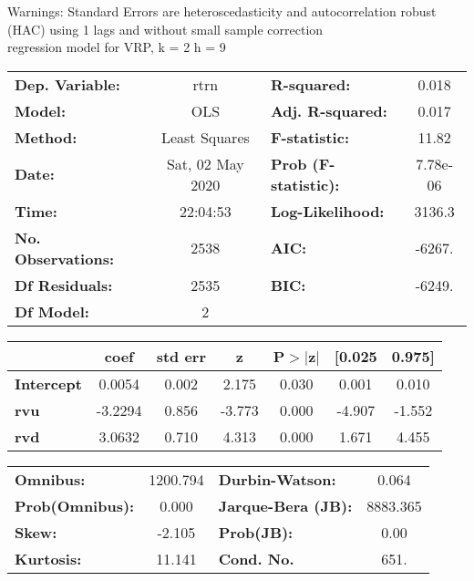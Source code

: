 Warnings: \newline
 [1] Standard Errors are heteroscedasticity and autocorrelation robust (HAC) using 1 lags and without small sample correction\\ 

regression model for VRP, k = 2 h = 9\begin{center}
\begin{tabular}{lclc}
\toprule
\textbf{Dep. Variable:}    &       rtrn       & \textbf{  R-squared:         } &     0.018   \\
\textbf{Model:}            &       OLS        & \textbf{  Adj. R-squared:    } &     0.017   \\
\textbf{Method:}           &  Least Squares   & \textbf{  F-statistic:       } &     11.82   \\
\textbf{Date:}             & Sat, 02 May 2020 & \textbf{  Prob (F-statistic):} &  7.78e-06   \\
\textbf{Time:}             &     22:04:53     & \textbf{  Log-Likelihood:    } &    3136.3   \\
\textbf{No. Observations:} &        2538      & \textbf{  AIC:               } &    -6267.   \\
\textbf{Df Residuals:}     &        2535      & \textbf{  BIC:               } &    -6249.   \\
\textbf{Df Model:}         &           2      & \textbf{                     } &             \\
\bottomrule
\end{tabular}
\begin{tabular}{lcccccc}
                   & \textbf{coef} & \textbf{std err} & \textbf{z} & \textbf{P$> |$z$|$} & \textbf{[0.025} & \textbf{0.975]}  \\
\midrule
\textbf{Intercept} &       0.0054  &        0.002     &     2.175  &         0.030        &        0.001    &        0.010     \\
\textbf{rvu}       &      -3.2294  &        0.856     &    -3.773  &         0.000        &       -4.907    &       -1.552     \\
\textbf{rvd}       &       3.0632  &        0.710     &     4.313  &         0.000        &        1.671    &        4.455     \\
\bottomrule
\end{tabular}
\begin{tabular}{lclc}
\textbf{Omnibus:}       & 1200.794 & \textbf{  Durbin-Watson:     } &    0.064  \\
\textbf{Prob(Omnibus):} &   0.000  & \textbf{  Jarque-Bera (JB):  } & 8883.365  \\
\textbf{Skew:}          &  -2.105  & \textbf{  Prob(JB):          } &     0.00  \\
\textbf{Kurtosis:}      &  11.141  & \textbf{  Cond. No.          } &     651.  \\
\bottomrule
\end{tabular}
\end{center}

